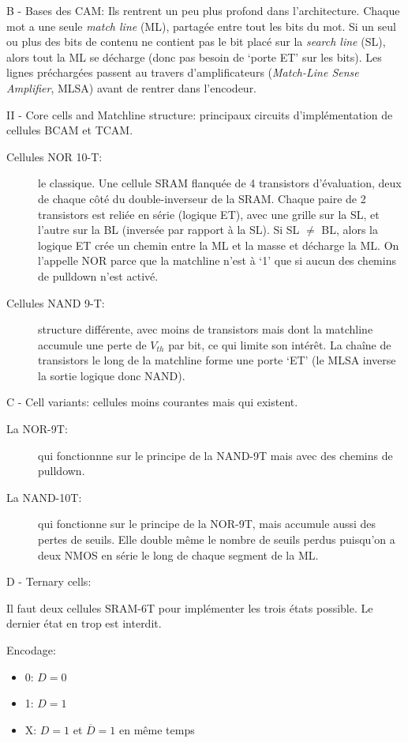 B - Bases des CAM: Ils rentrent un peu plus profond dans l'architecture. Chaque mot a une seule \emph{match line} (ML), partagée entre tout les bits du mot. Si un seul ou plus des bits de contenu ne contient pas le bit placé sur la \emph{search line} (SL), alors tout la ML se décharge (donc pas besoin de `porte ET' sur les bits). Les lignes préchargées passent au travers d'amplificateurs (\emph{Match-Line Sense Amplifier}, MLSA) avant de rentrer dans l'encodeur.

II - Core cells and Matchline structure: principaux circuits d'implémentation de cellules BCAM et TCAM.

\begin{description}
	\item[Cellules NOR 10-T:]{le classique. Une cellule SRAM flanquée de 4 transistors d'évaluation, deux de chaque côté du double-inverseur de la SRAM. Chaque paire de 2 transistors est reliée en série (logique ET), avec une grille sur la SL, et l'autre sur la BL (inversée par rapport à la SL). Si SL $\neq$ BL, alors la logique ET crée un chemin entre la ML et la masse et décharge la ML. On l'appelle NOR parce que la matchline n'est à `1' que si aucun des chemins de pulldown n'est activé.}
	\item[Cellules NAND 9-T:]{structure différente, avec moins de transistors mais dont la matchline accumule une perte de $V_{th}$ par bit, ce qui limite son intérêt. La chaîne de transistors le long de la matchline forme une porte `ET' (le MLSA inverse la sortie logique donc NAND).}
\end{description}

C - Cell variants: cellules moins courantes mais qui existent. 

\begin{description}
	\item[La NOR-9T:] qui fonctionnne sur le principe de la NAND-9T mais avec des chemins de pulldown. 
	\item[La NAND-10T:] qui fonctionne sur le principe de la NOR-9T, mais accumule aussi des pertes de seuils. Elle double même le nombre de seuils perdus puisqu'on a deux NMOS en série le long de chaque segment de la ML.
\end{description}

D - Ternary cells:

Il faut deux cellules SRAM-6T pour implémenter les trois états possible. Le dernier état en trop est interdit.

Encodage:
\begin{itemize}
	\item 0: $D = 0$
	\item 1: $D = 1$
	\item X: $D = 1$ et $\overline{D} = 1$ en même temps
\end{itemize}

